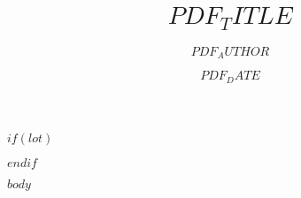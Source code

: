 \documentclass[
$FONT_SIZE$,
$if(lang)$
  $babel-lang$,
$endif$
]{scrartcl}
\date{$PDF_DATE$}
\title{$PDF_TITLE$}
\author{$PDF_AUTHOR$}
\begin{document}



\renewcommand*{\contentsname}{Table of Contents}
\tableofcontents
\pagebreak

$if(lot)$
\listoftables
$endif$


$body$

\pagebreak
\listoffigures
\end{document}
